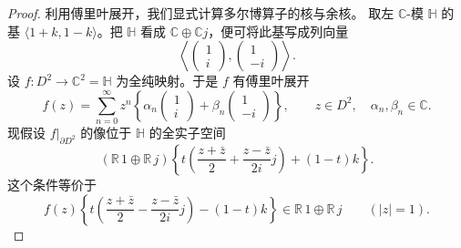 \begin{proof}
利用傅里叶展开，我们显式计算多尔博算子的核与余核。
取左 $\mathbb C$-模 $\mathbb H$ 的基
$\langle1+k,1-k\rangle$。把 $\mathbb H$ 看成
$\mathbb C\oplus\mathbb Cj$，便可将此基写成列向量
\[
 \left\langle
 \begin{pmatrix}1\\ i\end{pmatrix},
 \begin{pmatrix}1\\ -i\end{pmatrix}
 \right\rangle.
\]
设 $f\colon D^2\to\mathbb C^2=\mathbb H$ 为全纯映射。于是
$f$ 有傅里叶展开
\[
 f(z)=\sum_{n=0}^{\infty}z^n
 \left\{
 \alpha_n\begin{pmatrix}1\\ i\end{pmatrix}
 +\beta_n\begin{pmatrix}1\\ -i\end{pmatrix}
 \right\},
 \qquad z\in D^2,\quad \alpha_n,\beta_n\in\mathbb C.
\]
现假设 $f|_{\partial D^2}$ 的像位于 $\mathbb H$ 的全实子空间
\[
 (\mathbb R\,1\oplus\mathbb R\,j)
 \left\{
 t\left(\frac{z+\bar z}{2}+\frac{z-\bar z}{2i}j\right)
 +(1-t)k
 \right\}.
\]
这个条件等价于
\begin{equation}
 f(z)\left\{
 t\left(\frac{z+\bar z}{2}-\frac{z-\bar z}{2i}j\right)
 -(1-t)k
 \right\}\in\mathbb R\,1\oplus\mathbb R\,j
 \qquad(|z|=1).
 \tag{8.1.8}\label{eq:8-1-8}
\end{equation}


\end{proof}
